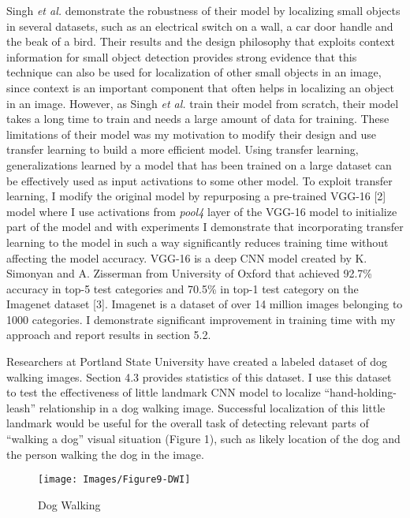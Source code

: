 \documentclass [11pt,letterpaper ,twoside ,openany ]{report}
\begin{document}
    Singh \textit {et al.} demonstrate the robustness of their model by localizing small objects in several datasets, such as an electrical switch on a wall, a car door handle and the beak of a bird. Their results and the design philosophy that exploits context information for small object detection provides strong evidence that this technique can also be used for localization of other small objects in an image, since context is an important component that often helps in localizing an object in an image. However, as Singh \textit{et al.} train their model from scratch, their model takes a long time to train and needs a large amount of data for training. These limitations of their model was my motivation to modify their design and use transfer learning to build a more efficient model. Using transfer learning, generalizations learned by a model that has been trained on a large dataset can be effectively used as input activations to some other model. To exploit transfer learning, I modify the original model by repurposing a pre-trained VGG-16 [2] model where I use activations from \textit{pool4} layer of the VGG-16 model to initialize part of the model and with experiments I demonstrate that incorporating  transfer learning to the model in such a way significantly reduces training time without affecting the model accuracy. VGG-16 is a deep CNN model created by K. Simonyan and A. Zisserman from University of Oxford that achieved 92.7\% accuracy in top-5 test categories and 70.5\% in top-1 test category on the Imagenet dataset [3]. Imagenet is a dataset of over 14 million images belonging to 1000 categories. I demonstrate significant improvement in training time with my approach and report results in section 5.2.

    Researchers at Portland State University have created a labeled dataset of dog walking images. Section 4.3 provides statistics of this dataset. I use this dataset to test the effectiveness of little landmark CNN model to localize ``hand-holding-leash'' relationship in a dog walking image. Successful localization of this little landmark would be useful for the overall task of detecting relevant parts of ``walking a dog'' visual situation (Figure 1), such as likely location of the dog and the person walking the dog in the image.

    \begin{wrapfigure}{l}[9mm]{0.5\textwidth}
        \begin{center}
            \texttt{[image: Images/Figure9-DWI]}
        \end{center}
        \caption{Dog Walking}
    \end{wrapfigure}    
\end{document}
